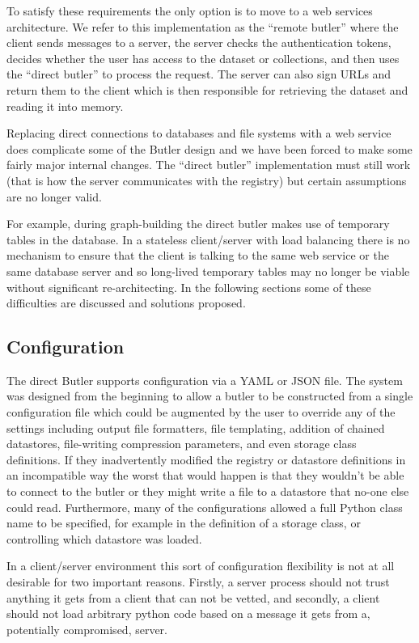 To satisfy these requirements the only option is to move to a web services architecture.
We refer to this implementation as the ``remote butler'' where the client sends messages to a server, the server checks the authentication tokens, decides whether the user has access to the dataset or collections, and then uses the ``direct butler'' to process the request.
The server can also sign URLs and return them to the client which is then responsible for retrieving the dataset and reading it into memory.

Replacing direct connections to databases and file systems with a web service does complicate some of the Butler design and we have been forced to make some fairly major internal changes.
The ``direct butler'' implementation must still work (that is how the server communicates with the registry) but certain assumptions are no longer valid.

For example, during graph-building the direct butler makes use of temporary tables in the database.
In a stateless client/server with load balancing there is no mechanism to ensure that the client is talking to the same web service or the same database server and so long-lived temporary tables may no longer be viable without significant re-architecting.
In the following sections some of these difficulties are discussed and solutions proposed.

\subsection{Configuration}

The direct Butler supports configuration via a YAML or JSON file.
The system was designed from the beginning to allow a butler to be constructed from a single configuration file which could be augmented by the user to override any of the settings including output file formatters, file templating, addition of chained datastores, file-writing compression parameters, and even storage class definitions.
If they inadvertently modified the registry or datastore definitions in an incompatible way the worst that would happen is that they wouldn't be able to connect to the butler or they might write a file to a datastore that no-one else could read.
Furthermore, many of the configurations allowed a full Python class name to be specified, for example in the definition of a storage class, or controlling which datastore was loaded.

In a client/server environment this sort of configuration flexibility is not at all desirable for two important reasons.
Firstly, a server process should not trust anything it gets from a client that can not be vetted, and secondly, a client should not load arbitrary python code based on a message it gets from a, potentially compromised, server.

